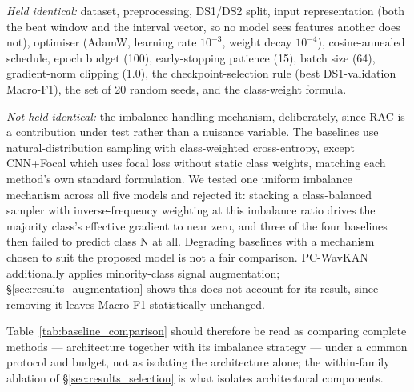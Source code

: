 \documentclass[journal,twoside,web]{ieeecolor}
\begin{document}
\emph{Held identical:} dataset, preprocessing, DS1/DS2 split, input representation (both the beat window and the interval vector, so no model sees features another does not), optimiser (AdamW, learning rate $10^{-3}$, weight decay $10^{-4}$), cosine-annealed schedule, epoch budget (100), early-stopping patience (15), batch size (64), gradient-norm clipping (1.0), the checkpoint-selection rule (best DS1-validation Macro-F1), the set of 20 random seeds, and the class-weight formula.

\emph{Not held identical:} the imbalance-handling mechanism, deliberately, since RAC is a contribution under test rather than a nuisance variable. The baselines use natural-distribution sampling with class-weighted cross-entropy, except CNN+Focal which uses focal loss without static class weights, matching each method's own standard formulation. We tested one uniform imbalance mechanism across all five models and rejected it: stacking a class-balanced sampler with inverse-frequency weighting at this imbalance ratio drives the majority class's effective gradient to near zero, and three of the four baselines then failed to predict class N at all. Degrading baselines with a mechanism chosen to suit the proposed model is not a fair comparison. PC-WavKAN additionally applies minority-class signal augmentation; \S\ref{sec:results_augmentation} shows this does not account for its result, since removing it leaves Macro-F1 statistically unchanged.

Table~\ref{tab:baseline_comparison} should therefore be read as comparing complete methods --- architecture together with its imbalance strategy --- under a common protocol and budget, not as isolating the architecture alone; the within-family ablation of \S\ref{sec:results_selection} is what isolates architectural components.

\begin{table}[!t]
\caption{Baseline Architectures. Protocol, split, input representation, optimiser, budget, checkpoint rule and seeds are identical to PC-WavKAN (\S\ref{sec:baselines}); imbalance handling differs by design.}
\label{tab:baselines}
\centering
\footnotesize
{}
\end{table}
\end{document}
